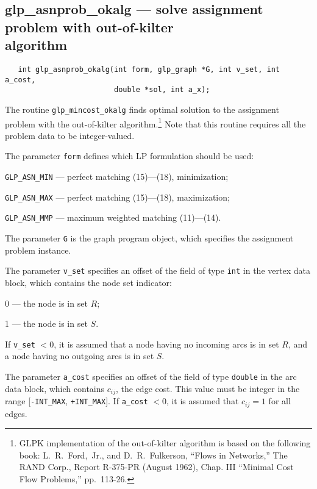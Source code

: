 \documentclass[11pt]{report}
\def\para#1{\noindent{\bf#1}}
\def\synopsis{\para{Synopsis}}
\def\description{\para{Description}}
\begin{document}
\newpage

\subsection{glp\_asnprob\_okalg --- solve assignment problem with
out-of-kilter\\algorithm}

\synopsis

\begin{verbatim}
   int glp_asnprob_okalg(int form, glp_graph *G, int v_set, int a_cost,
                         double *sol, int a_x);
\end{verbatim}

\description

The routine \verb|glp_mincost_okalg| finds optimal solution to the
assignment problem with the out-of-kilter
algorithm.\footnote{GLPK implementation of the out-of-kilter algorithm
is based on the following book: L.~R.~Ford,~Jr., and D.~R.~Fulkerson,
``Flows in Networks,'' The RAND Corp., Report R-375-PR (August 1962),
Chap. III ``Minimal Cost Flow Problems,'' pp.~113-26.} Note that this
routine requires all the problem data to be integer-valued.

The parameter \verb|form| defines which LP formulation should be used:

\verb|GLP_ASN_MIN| --- perfect matching (15)---(18), minimization;

\verb|GLP_ASN_MAX| --- perfect matching (15)---(18), maximization;

\verb|GLP_ASN_MMP| --- maximum weighted matching (11)---(14).

The parameter \verb|G| is the graph program object, which specifies the
assignment problem instance.

The parameter \verb|v_set| specifies an offset of the field of type
\verb|int| in the vertex data block, which contains the node set
indicator:

0 --- the node is in set $R$;

1 --- the node is in set $S$.

\noindent
If \verb|v_set| $<0$, it is assumed that a node having no incoming arcs
is in set $R$, and a node having no outgoing arcs is in set $S$.

The parameter \verb|a_cost| specifies an offset of the field of type
\verb|double| in the arc data block, which contains $c_{ij}$, the edge
cost. This value must be integer in the range [\verb|-INT_MAX|,
\verb|+INT_MAX|]. If \verb|a_cost| $<0$, it is assumed that $c_{ij}=1$
for all edges.
\end{document}
